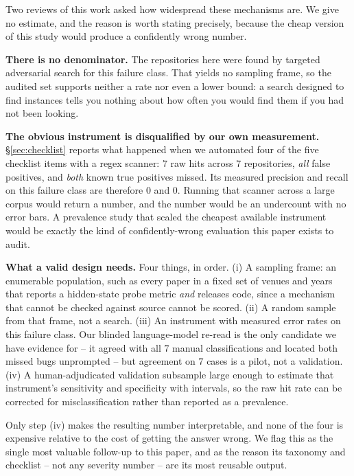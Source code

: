 \documentclass{article}
\begin{document}
Two reviews of this work asked how widespread these mechanisms are. We give no
estimate, and the reason is worth stating precisely, because the cheap version
of this study would produce a confidently wrong number.

\textbf{There is no denominator.} The repositories here were found by targeted
adversarial search for this failure class. That yields no sampling frame, so
the audited set supports neither a rate nor even a lower bound: a search
designed to find instances tells you nothing about how often you would find
them if you had not been looking.

\textbf{The obvious instrument is disqualified by our own measurement.}
\S\ref{sec:checklist} reports what happened when we automated four of the five
checklist items with a regex scanner: $7$ raw hits across $7$ repositories,
\emph{all} false positives, and \emph{both} known true positives missed. Its
measured precision and recall on this failure class are therefore $0$ and $0$.
Running that scanner across a large corpus would return a number, and the
number would be an undercount with no error bars. A prevalence study that
scaled the cheapest available instrument would be exactly the kind of
confidently-wrong evaluation this paper exists to audit.

\textbf{What a valid design needs.} Four things, in order. (i) A sampling
frame: an enumerable population, such as every paper in a fixed set of venues
and years that reports a hidden-state probe metric \emph{and} releases code,
since a mechanism that cannot be checked against source cannot be scored.
(ii) A random sample from that frame, not a search. (iii) An instrument with
measured error rates on this failure class. Our blinded language-model re-read
is the only candidate we have evidence for -- it agreed with all $7$ manual
classifications and located both missed bugs unprompted -- but agreement on
$7$ cases is a pilot, not a validation. (iv) A human-adjudicated validation
subsample large enough to estimate that instrument's sensitivity and
specificity with intervals, so the raw hit rate can be corrected for
misclassification rather than reported as a prevalence.

Only step (iv) makes the resulting number interpretable, and none of the four
is expensive relative to the cost of getting the answer wrong. We flag this as
the single most valuable follow-up to this paper, and as the reason its
taxonomy and checklist -- not any severity number -- are its most reusable
output.
\end{document}
